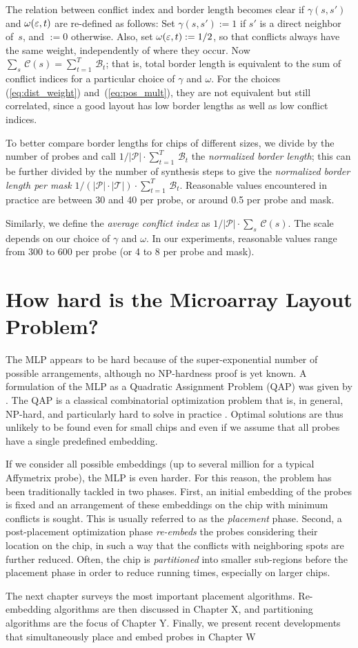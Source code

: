 The relation between conflict index and border length becomes clear if
$\gamma(s,s')$ and $\omega(\varepsilon,t)$ are re-defined as follows: Set
$\gamma(s,s') := 1$ if $s'$ is a direct neighbor of~$s$, and $:=0$ otherwise.
Also, set $\omega(\varepsilon,t) := 1/2$, so that conflicts always have the same
weight, independently of where they occur. Now $\sum_s\, \mathcal{C}(s) =
\sum_{t=1}^T\, \mathcal{B}_t$; that is, total border length is equivalent to
the sum of conflict indices for a particular choice of $\gamma$ and $\omega$.
For the choices (\ref{eq:dist_weight}) and~(\ref{eq:pos_mult}), they are not
equivalent but still correlated, since a good layout has low border lengths as
well as low conflict indices.

To better compare border lengths for chips of different sizes, we
divide by the number of probes and call $1/|\mathcal{P}| \cdot
\sum_{t=1}^T\, \mathcal{B}_t$ the \emph{normalized border length};
this can be further divided by the number of synthesis steps to give
the \emph{normalized border length per mask} $1/(|\mathcal{P}|\cdot
|\mathcal{T}|) \cdot \sum_{t=1}^T\, \mathcal{B}_t$. Reasonable values
encountered in practice are between 30 and 40 per probe, or around 0.5
per probe and mask.

Similarly, we define the \emph{average conflict index} as
$1/|\mathcal{P}| \cdot \sum_s\, \mathcal{C}(s)$. The scale depends on
our choice of $\gamma$ and $\omega$. In our experiments, reasonable
values range from 300 to 600 per probe (or 4 to 8 per probe and mask).


\section{How hard is the Microarray Layout Problem?}
\label{sec:mlp_how_hard}

The MLP appears to be hard because of the super-exponential number of possible
arrangements, although no NP-hardness proof is yet known. A formulation of the
MLP as a Quadratic Assignment Problem (QAP) was given by
\citet{Carvalho2006a}.  The QAP is a classical combinatorial optimization
problem that is, in general, NP-hard, and particularly hard to solve in
practice \citep{Cela1997}. Optimal solutions are thus unlikely to be found
even for small chips and even if we assume that all probes have a single
predefined embedding.

If we consider all possible embeddings (up to several million for a typical
Affymetrix probe), the MLP is even harder. For this reason, the problem has
been traditionally tackled in two phases. First, an initial embedding of the
probes is fixed and an arrangement of these embeddings on the chip with minimum
conflicts is sought. This is usually referred to as the \emph{placement} phase.
Second, a post-placement optimization phase \emph{re-embeds} the probes
considering their location on the chip, in such a way that the conflicts with
neighboring spots are further reduced. Often, the chip is \emph{partitioned} 
into smaller sub-regions before the placement phase in order
to reduce running times, especially on larger chips.


The next chapter surveys the most important placement algorithms. Re-embedding
algorithms are then discussed in Chapter X, and partitioning
algorithms are the focus of Chapter Y. Finally, we present 
recent developments that simultaneously place and embed probes in Chapter W

